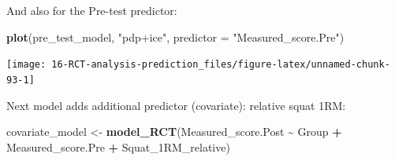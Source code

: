 \documentclass[
]{book}
\newenvironment{Shaded}{\begin{snugshade}}{\end{snugshade}}
\newcommand{\DataTypeTok}[1]{\textcolor[rgb]{0.13,0.29,0.53}{#1}}
\newcommand{\KeywordTok}[1]{\textcolor[rgb]{0.13,0.29,0.53}{\textbf{#1}}}
\newcommand{\NormalTok}[1]{#1}
\newcommand{\OperatorTok}[1]{\textcolor[rgb]{0.81,0.36,0.00}{\textbf{#1}}}
\newcommand{\StringTok}[1]{\textcolor[rgb]{0.31,0.60,0.02}{#1}}
\begin{document}
And also for the Pre-test predictor:

\begin{Shaded}
\begin{Highlighting}[]
\KeywordTok{plot}\NormalTok{(pre\_test\_model, }\StringTok{"pdp+ice"}\NormalTok{, }\DataTypeTok{predictor =} \StringTok{"Measured\_score.Pre"}\NormalTok{)}
\end{Highlighting}
\end{Shaded}

\begin{center}\texttt{[image: 16-RCT-analysis-prediction\_files/figure-latex/unnamed-chunk-93-1]} \end{center}

Next model adds additional predictor (covariate): relative squat 1RM:

\begin{Shaded}
\begin{Highlighting}[]
\NormalTok{covariate\_model <{-}}\StringTok{ }\KeywordTok{model\_RCT}\NormalTok{(Measured\_score.Post }\OperatorTok{\textasciitilde{}}\StringTok{ }\NormalTok{Group }\OperatorTok{+}\StringTok{ }\NormalTok{Measured\_score.Pre }\OperatorTok{+}\StringTok{ }\NormalTok{Squat\_1RM\_relative)}


\end{Highlighting}
\end{Shaded}
\end{document}
